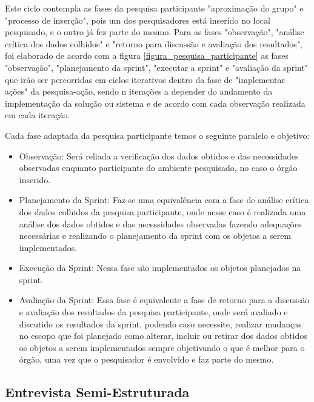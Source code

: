 Este ciclo contempla as fases da pesquisa participante "aproximação do grupo" e "processo de inserção", pois um dos pesquisadores está inserido no local pesquisado, e o outro já fez parte do mesmo. Para as fases "observação", "análise crítica dos dados colhidos" e "retorno para discussão e avaliação dos resultados", foi elaborado de acordo com a figura \ref{figura_pesquisa_participante} as fases "observação", "planejamento da sprint", "executar a sprint" e "avaliação da sprint" que irão ser percorridas em ciclos iterativos dentro da fase de "implementar ações" da pesquisa-ação, sendo n iterações a depender do andamento da implementação da solução ou sistema e de acordo com cada observação realizada em cada iteração.

Cada fase adaptada da pesquisa participante temos o seguinte paralelo e objetivo:

\begin{itemize}
	\item Observação: Será reliada a verificação dos dados obtidos e das necessidades observadas enquanto participante do ambiente pesquisado, no caso o órgão inserido.
	\item Planejamento da Sprint: Faz-se uma equivalência com a fase de análise crítica dos dados colhidos da pesquisa participante, onde nesse caso é realizada uma análise dos dados obtidos e das necessidades observadas fazendo adequações necessárias e realizando o planejamento da sprint com os objetos a serem implementados.
	\item Execução da Sprint: Nessa fase são implementados os objetos planejados na sprint.
	\item Avaliação da Sprint: Essa fase é equivalente a fase de retorno para a discussão e avaliação dos resultados da pesquisa participante, onde será avaliado e discutido os resultados da sprint, podendo caso necessite, realizar mudanças no escopo que foi planejado como alterar, incluir ou retirar dos dados obtidos os objetos a serem implementados sempre objetivando o que é melhor para o órgão, uma vez que o pesquisador é envolvido e faz parte do mesmo.
\end{itemize}



\subsection{Entrevista Semi-Estruturada}

